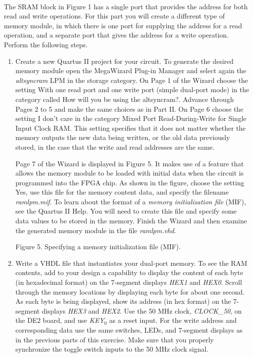 \documentclass[psfig,10pt,fullpage]{article}
\begin{document}
~\\
The SRAM block in Figure 1 has a single port that provides the address for both read and
write operations. For this part you will create a different type of memory module, in
which there is one port for supplying the address for a read operation, and a separate
port that gives the address for a write operation. Perform the following steps.

\begin{enumerate}
\item Create a new Quartus II project for your circuit. To generate the desired memory
module open the MegaWizard Plug-in Manager and select again the 
{\it altsyncram} LPM in the {\sf storage} category. On Page 1 of the Wizard choose the
setting {\sf With one read port and one write port (simple dual-port mode)} in the category
called {\sf How will you be using the altsyncram?}. Advance through Pages 2 to 5 and make
the same choices as in Part II. On Page 6 choose the setting {\sf I don't care} in the category
{\sf Mixed Port Read-During-Write for Single Input Clock RAM}. This setting specifies that
it does not matter whether the memory outputs the new data being written, or the old data
previously stored, in the case that the write and read addresses are the same.

Page 7 of the Wizard is displayed in Figure 5. It makes use of
a feature that allows the memory module to be loaded with initial data when the circuit is
programmed into the FPGA chip. As shown in the figure, choose the setting {\sf Yes, use this
file for the memory content data}, and specify the filename {\it ramlpm.mif}. To learn
about the format of a {\it memory initialization file} (MIF), see the Quartus II Help.
You will need to create this file and specify some data values to be stored in the memory.
Finish the Wizard and then examine the generated memory module in the file {\it ramlpm.vhd}.

\begin{figure}[H]
\scriptsize
\centerline{
\hbox{}}
\end{figure}
\centerline{Figure 5.  Specifying a memory initialization file (MIF).}

\item Write a VHDL file that instantiates your dual-port memory. 
To see the RAM contents, add to your design a capability to display the
content of each byte (in hexadecimal format) on the 7-segment displays
{\it HEX1} and {\it HEX0}. Scroll through the memory locations by displaying each byte for
about one second. As each byte is being displayed, show its address (in hex format)
on the 7-segment displays {\it HEX3} and {\it HEX2}. Use the 50 MHz clock, {\it CLOCK\_50}, on
the DE2 board, and use {\it KEY}$_0$ as a reset input. For the write address and
corresponding data use the same switches, LEDs, and 7-segment displays as in the previous 
parts of this exercise. Make sure that you properly synchronize the toggle switch inputs
to the 50 MHz clock signal.


\end{enumerate}
\end{document}

